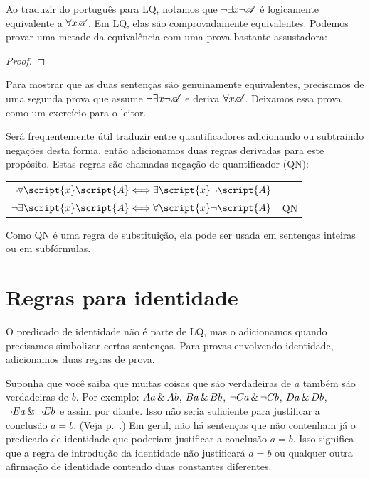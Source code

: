 Ao traduzir do português para LQ, notamos que $\neg\exists x\neg\mathscr{A}$ é logicamente equivalente a $\forall x\mathscr{A}$. Em LQ, elas são comprovadamente equivalentes. Podemos provar uma metade da equivalência com uma prova bastante assustadora:

\begin{proof}
	 
	\open
		\open
			\open
			\close
		\close
	\close
\end{proof}

Para mostrar que as duas sentenças são genuinamente equivalentes, precisamos de uma segunda prova que assume $\neg\exists x\neg\mathscr{A}$ e deriva $\forall x\mathscr{A}$. Deixamos essa prova como um exercício para o leitor.

Será frequentemente útil traduzir entre quantificadores adicionando ou subtraindo negações desta forma, então adicionamos duas regras derivadas para este propósito. Estas regras são chamadas negação de quantificador (QN):
\begin{center}
\begin{tabular}{rl}
$\enot\forall\script{x}\script{A} \Longleftrightarrow \exists\script{x}\enot\script{A}$\\
$\enot\exists\script{x}\script{A} \Longleftrightarrow \forall\script{x}\enot\script{A}$
& QN
\end{tabular}
\end{center}
Como QN é uma regra de substituição, ela pode ser usada em sentenças inteiras ou em subfórmulas.


\section{Regras para identidade}
O predicado de identidade não é parte de LQ, mas o adicionamos quando precisamos simbolizar certas sentenças. Para provas envolvendo identidade, adicionamos duas regras de prova.

Suponha que você saiba que muitas coisas que são verdadeiras de $a$ também são verdadeiras de $b$. Por exemplo: $Aa\,\&\, Ab$, $Ba\,\&\, Bb$, $\neg Ca\,\&\,\neg Cb$, $Da\,\&\, Db$, $\neg Ea\,\&\,\neg Eb$ e assim por diante. Isso não seria suficiente para justificar a conclusão $a=b$. (Veja p.~\pageref{model.nonidentity}.) Em geral, não há sentenças que não contenham já o predicado de identidade que poderiam justificar a conclusão $a=b$. Isso significa que a regra de introdução da identidade não justificará $a=b$ ou qualquer outra afirmação de identidade contendo duas constantes diferentes.

